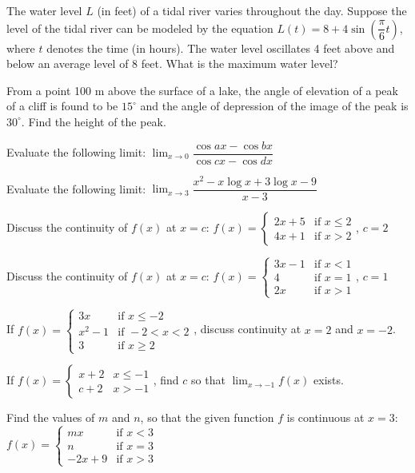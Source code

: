\documentclass[11pt,a4paper]{article}
\begin{document}
\begin{longlist}
\item The water level $L$ (in feet) of a tidal river varies throughout the day. Suppose the level of the tidal river can be modeled by the equation $L(t) = 8+4\sin\left(\dfrac{\pi}{6}t\right)$, where $t$ denotes the time (in hours). The water level oscillates 4 feet above and below an average level of 8 feet. What is the maximum water level?

\item From a point 100 m above the surface of a lake, the angle of elevation of a peak of a cliff is found to be $15^\circ$ and the angle of depression of the image of the peak is $30^\circ$. Find the height of the peak.

\item Evaluate the following limit: $\displaystyle\lim_{x\to0}\dfrac{\cos ax - \cos bx}{\cos cx - \cos dx}$

\item Evaluate the following limit: $\displaystyle\lim_{x\to3}\dfrac{x^2-x\log x + 3\log x -9}{x-3}$

\item Discuss the continuity of $f(x)$ at $x=c$: $f(x) = \begin{cases} 2x+5 & \text{if } x\leq 2 \\ 4x+1 & \text{if } x>2 \end{cases}$, $c=2$

\item Discuss the continuity of $f(x)$ at $x=c$: $f(x) = \begin{cases} 3x-1 & \text{if } x<1 \\ 4 & \text{if } x=1 \\ 2x & \text{if } x>1 \end{cases}$, $c=1$

\item If $f(x) = \begin{cases} 3x & \text{if } x\leq -2 \\ x^2-1 & \text{if } -2<x<2 \\ 3 & \text{if } x\geq 2 \end{cases}$, discuss continuity at $x=2$ and $x=-2$.

\item If $f(x) = \begin{cases} x+2 & x\leq -1 \\ c+2 & x>-1 \end{cases}$, find $c$ so that $\displaystyle\lim_{x\to-1} f(x)$ exists.

\item Find the values of $m$ and $n$, so that the given function $f$ is continuous at $x=3$: $f(x) = \begin{cases} mx & \text{if } x<3 \\ n & \text{if } x=3 \\ -2x+9 & \text{if } x>3 \end{cases}$


\end{longlist}
\end{document}
